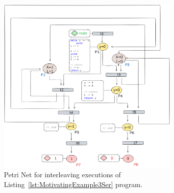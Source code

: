 \begin{figure}[H]
	\centering
	\includegraphics[width=0.8\textwidth]{plots/code_3_PN_with_annotation.png}
	\caption{Petri Net for interleaving executions of Listing~\ref{lst:MotivatingExample3Ser} program.}
	\label{fig:code3ExamplePN}
\end{figure}

\newpage